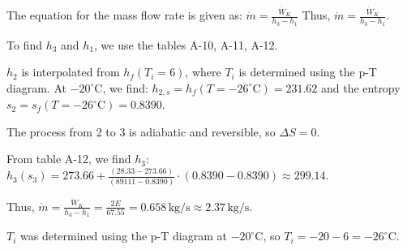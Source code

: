 The equation for the mass flow rate is given as:  
\( \dot{m} = \frac{\dot{W}_K}{h_3 - h_1} \)  
Thus, \( \dot{m} = \frac{\dot{W}_K}{h_3 - h_1} \).  

To find \( h_3 \) and \( h_1 \), we use the tables A-10, A-11, A-12.  

\( h_2 \) is interpolated from \( h_f(T_i = 6) \), where \( T_i \) is determined using the p-T diagram.  
At \( -20^\circ \text{C} \), we find:  
\( h_{2,s} = h_f(T = -26^\circ \text{C}) = 231.62 \)  
and the entropy \( s_2 = s_f(T = -26^\circ \text{C}) = 0.8390 \).  

The process from 2 to 3 is adiabatic and reversible, so \( \Delta S = 0 \).  

From table A-12, we find \( h_3 \):  
\( h_3(s_3) = 273.66 + \frac{(28.33 - 273.66)}{(89111 - 0.8390)} \cdot (0.8390 - 0.8390) \approx 299.14 \).  

Thus,  
\( \dot{m} = \frac{\dot{W}_K}{h_3 - h_1} = \frac{2E}{67.55} = 0.658 \, \text{kg/s} \approx 2.37 \, \text{kg/s}. \)  

\( T_i \) was determined using the p-T diagram at \( -20^\circ \text{C} \), so \( T_i = -20 - 6 = -26^\circ \text{C}. \)